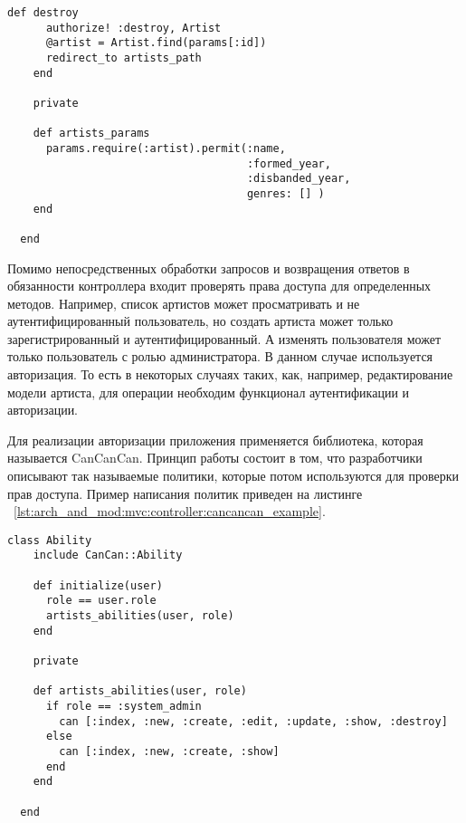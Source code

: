 \begin{lstlisting}[style=fsharpstyle,caption={Пример получения артистов по определенным параметрам}, label=lst:arch_and_mod:mvc:controller:artists_controller_example]
    def destroy
      authorize! :destroy, Artist
      @artist = Artist.find(params[:id])
      redirect_to artists_path
    end

    private

    def artists_params
      params.require(:artist).permit(:name,
                                     :formed_year,
                                     :disbanded_year,
                                     genres: [] )
    end

  end
\end{lstlisting}

Помимо непосредственных обработки запросов и возвращения ответов в обязанности контроллера входит проверять права доступа для определенных методов. Например, список артистов может просматривать и не аутентифицированный пользователь, но создать артиста может только зарегистрированный и аутентифицированный. А изменять пользователя может только пользователь с ролью администратора. В данном случае используется авторизация. То есть в некоторых случаях таких, как, например, редактирование модели артиста, для операции необходим функционал аутентификации и авторизации.

Для реализации авторизации приложения применяется библиотека, которая называется CanCanCan. Принцип работы состоит в том, что разработчики описывают так называемые политики, которые потом используются для проверки прав доступа. Пример написания политик приведен на листинге ~\ref{lst:arch_and_mod:mvc:controller:cancancan_example}.

\begin{lstlisting}[style=fsharpstyle,caption={Пример получения артистов по определенным параметрам}, label=lst:arch_and_mod:mvc:controller:cancancan_example]
  class Ability
    include CanCan::Ability

    def initialize(user)
      role == user.role
      artists_abilities(user, role)
    end

    private

    def artists_abilities(user, role)
      if role == :system_admin
        can [:index, :new, :create, :edit, :update, :show, :destroy]
      else
        can [:index, :new, :create, :show]
      end
    end

  end

\end{lstlisting}

